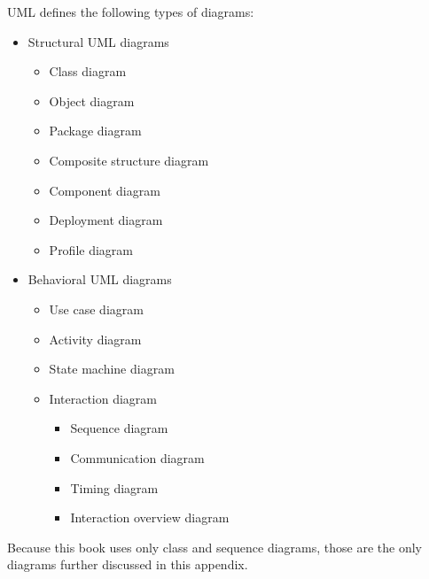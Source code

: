 UML defines the following types of diagrams:

\begin{itemize}
\item
Structural UML diagrams

\begin{itemize}
\item
Class diagram

\item
Object diagram

\item
Package diagram

\item
Composite structure diagram

\item
Component diagram

\item
Deployment diagram

\item
Profile diagram
\end{itemize}

\item
Behavioral UML diagrams

\begin{itemize}
\item
Use case diagram

\item
Activity diagram

\item
State machine diagram

\item
Interaction diagram
\begin{itemize}
\item
Sequence diagram

\item
Communication diagram

\item
Timing diagram

\item
Interaction overview diagram
\end{itemize}
\end{itemize}

\end{itemize}

Because this book uses only class and sequence diagrams, those are the only diagrams further discussed in this appendix.













